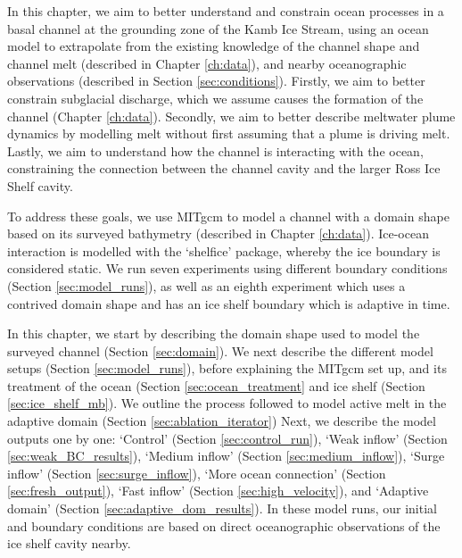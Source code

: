 In this chapter, we aim to better understand and constrain ocean processes in a basal channel at the grounding zone of the Kamb Ice Stream, using an ocean model to extrapolate from the existing knowledge of the channel shape and channel melt (described in Chapter \ref{ch:data}), and nearby oceanographic observations (described in Section \ref{sec:conditions}).  Firstly, we aim to better constrain subglacial discharge, which we assume causes the formation of the channel (Chapter \ref{ch:data}). Secondly, we aim to better describe meltwater plume dynamics by modelling melt without first assuming that a plume is driving melt. Lastly, we aim to understand how the channel is interacting with the  ocean, constraining the connection between the channel cavity and the larger Ross Ice Shelf cavity. 

To address these goals, we use MITgcm to model a channel with a domain shape based on its surveyed bathymetry (described in Chapter \ref{ch:data}). 
Ice-ocean interaction is modelled with the `shelfice' package, whereby the ice boundary is considered static. We run seven experiments using different boundary conditions (Section \ref{sec:model_runs}), as well as an eighth experiment which uses a contrived domain shape and has an ice shelf boundary which is adaptive in time.


In this chapter, we start by describing the domain shape used to model the surveyed channel  (Section \ref{sec:domain}). We next describe the different model setups (Section \ref{sec:model_runs}), before explaining the MITgcm set up, and its treatment of the ocean (Section \ref{sec:ocean_treatment} and ice shelf (Section \ref{sec:ice_shelf_mb}). We outline the process followed to model active melt in the adaptive domain (Section  \ref{sec:ablation_iterator}) Next, we describe the model outputs one by one: `Control' (Section \ref{sec:control_run}), `Weak inflow' (Section \ref{sec:weak_BC_results}), `Medium inflow' (Section \ref{sec:medium_inflow}), `Surge inflow' (Section \ref{sec:surge_inflow}), `More ocean connection' (Section \ref{sec:fresh_output}), `Fast inflow' (Section \ref{sec:high_velocity}), and `Adaptive domain' (Section \ref{sec:adaptive_dom_results}).
In these model runs, our initial and boundary conditions are based on direct oceanographic observations of the ice shelf cavity nearby.

